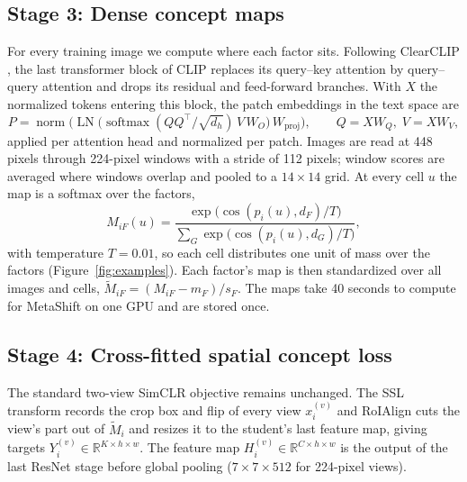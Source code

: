 \documentclass{article}
\begin{document}
\subsection{Stage 3: Dense concept maps}
For every training image we compute where each factor sits. Following ClearCLIP \citep{lan2024clearclip}, the last transformer block of CLIP replaces its query--key attention by query--query attention and drops its residual and feed-forward branches. With $X$ the normalized tokens entering this block, the patch embeddings in the text space are
\begin{equation}
 P=\operatorname{norm}\!\Big(\operatorname{LN}\big(\operatorname{softmax}(QQ^\top/\sqrt{d_h})\,V\,W_O\big)\,W_{\mathrm{proj}}\Big),
 \qquad Q=XW_Q,\; V=XW_V,
\end{equation}
applied per attention head and normalized per patch. Images are read at 448 pixels through 224-pixel windows with a stride of 112 pixels; window scores are averaged where windows overlap and pooled to a $14\times14$ grid. At every cell $u$ the map is a softmax over the factors,
\begin{equation}
 M_{iF}(u)=\frac{\exp\!\big(\cos(p_i(u),d_F)/T\big)}{\sum_{G}\exp\!\big(\cos(p_i(u),d_G)/T\big)},
\end{equation}
with temperature $T=0.01$, so each cell distributes one unit of mass over the factors (Figure~\ref{fig:examples}). Each factor's map is then standardized over all images and cells, $\tilde M_{iF}=(M_{iF}-m_F)/s_F$. The maps take 40 seconds to compute for MetaShift on one GPU and are stored once.

\subsection{Stage 4: Cross-fitted spatial concept loss}
The standard two-view SimCLR objective remains unchanged. The SSL transform records the crop box and flip of every view $x_i^{(v)}$ and RoIAlign cuts the view's part out of $\tilde M_i$ and resizes it to the student's last feature map, giving targets $Y_i^{(v)}\in\mathbb{R}^{K\times h\times w}$. The feature map $H_i^{(v)}\in\mathbb{R}^{C\times h\times w}$ is the output of the last ResNet stage before global pooling ($7\times7\times512$ for 224-pixel views).
\end{document}

